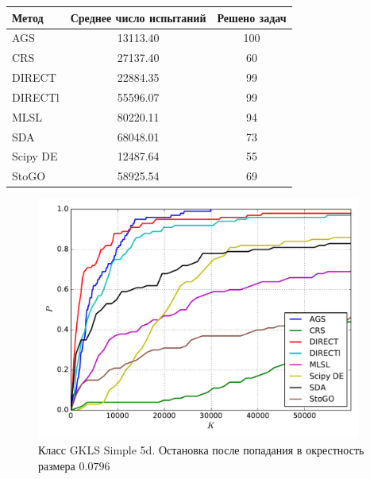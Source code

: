 \documentclass[a4paper]{article}
\begin{document}
\begin{tabular}{lcc}
\hline
 Метод    &  Среднее число испытаний  &  Решено задач  \\
\hline
 AGS      &         13113.40          &      100       \\
 CRS      &         27137.40          &       60       \\
 DIRECT   &         22884.35          &       99       \\
 DIRECTl  &         55596.07          &       99       \\
 MLSL     &         80220.11          &       94       \\
 SDA      &         68048.01          &       73       \\
 Scipy DE &         12487.64          &       55       \\
 StoGO    &         58925.54          &       69       \\
\hline
\end{tabular}
\begin{figure}[H]
  \center
  \includegraphics[width=0.95\textwidth]{../experiments/gklss5d_serg/cmc.pdf}
  \caption{Класс GKLS Simple 5d. Остановка после попадания в окрестность размера $0.0796$}
  \label{fig:}
\end{figure}
\end{document}
